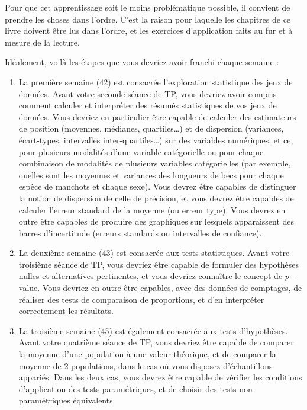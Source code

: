 \documentclass[
  a4paper,
  DIV=11,
  numbers=noendperiod,
  oneside]{scrreprt}
\begin{document}
Pour que cet apprentissage soit le moins problématique possible, il
convient de prendre les choses dans l'ordre. C'est la raison pour
laquelle les chapitres de ce livre doivent être lus dans l'ordre, et les
exercices d'application faits au fur et à mesure de la lecture.

Idéalement, voilà les étapes que vous devriez avoir franchi chaque
semaine :

\begin{enumerate}
\def\labelenumi{\arabic{enumi}.}
\item
  La première semaine (42) est consacrée l'exploration statistique des
  jeux de données. Avant votre seconde séance de TP, vous devriez avoir
  compris comment calculer et interpréter des résumés statistiques de
  vos jeux de données. Vous devriez en particulier être capable de
  calculer des estimateurs de position (moyennes, médianes,
  quartiles\ldots) et de dispersion (variances, écart-types, intervalles
  inter-quartiles\ldots) sur des variables numériques, et ce, pour
  plusieurs modalités d'une variable catégorielle ou pour chaque
  combinaison de modalités de plusieurs variables catégorielles (par
  exemple, quelles sont les moyennes et variances des longueurs de becs
  pour chaque espèce de manchots et chaque sexe). Vous devrez être
  capables de distinguer la notion de dispersion de celle de précision,
  et vous devrez être capables de calculer l'erreur standard de la
  moyenne (ou erreur type). Vous devrez en outre être capables de
  produire des graphiques sur lesquels apparaissent des barres
  d'incertitude (erreurs standards ou intervalles de confiance).
\item
  La deuxième semaine (43) est consacrée aux tests statistiques. Avant
  votre troisième séance de TP, vous devriez être capable de formuler
  des hypothèses nulles et alternatives pertinentes, et vous devriez
  connaître le concept de \(p-\)value. Vous devriez en outre être
  capables, avec des données de comptages, de réaliser des tests de
  comparaison de proportions, et d'en interpréter correctement les
  résultats.
\item
  La troisième semaine (45) est également consacrée aux tests
  d'hypothèses. Avant votre quatrième séance de TP, vous devriez être
  capable de comparer la moyenne d'une population à une valeur
  théorique, et de comparer la moyenne de 2 populations, dans le cas où
  vous disposez d'échantillons appariés. Dans les deux cas, vous devrez
  être capable de vérifier les conditions d'application des tests
  paramétriques, et de choisir des tests non-paramétriques équivalents

\end{enumerate}
\end{document}
